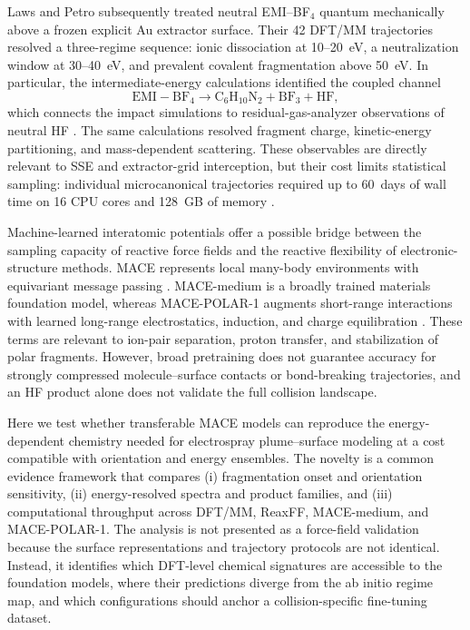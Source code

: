 \documentclass[preprint,review,12pt]{elsarticle}
\begin{document}
Laws and Petro \cite{Laws2026} subsequently treated neutral EMI--BF$_4$
quantum mechanically above a frozen explicit Au extractor surface. Their 42
DFT/MM trajectories resolved a three-regime sequence: ionic dissociation at
10--20~eV, a neutralization window at 30--40~eV, and prevalent covalent
fragmentation above 50~eV. In particular, the intermediate-energy calculations
identified the coupled channel
\begin{equation}
  \mathrm{EMI\!-\!BF_4 \rightarrow C_6H_{10}N_2 + BF_3 + HF},
  \label{eq:hf_channel}
\end{equation}
which connects the impact simulations to residual-gas-analyzer observations
of neutral HF \cite{Shaik2024}. The same calculations resolved fragment charge,
kinetic-energy partitioning, and mass-dependent scattering. These observables
are directly relevant to SSE and extractor-grid interception, but their cost
limits statistical sampling: individual microcanonical trajectories required
up to 60~days of wall time on 16 CPU cores and 128~GB of memory
\cite{Laws2026}.

Machine-learned interatomic potentials offer a possible bridge between the
sampling capacity of reactive force fields and the reactive flexibility of
electronic-structure methods. MACE represents local many-body environments
with equivariant message passing \cite{Batatia2022}. MACE-medium is a broadly
trained materials foundation model, whereas MACE-POLAR-1 augments short-range
interactions with learned long-range electrostatics, induction, and charge
equilibration \cite{Batatia2026Polar}. These terms are relevant to ion-pair
separation, proton transfer, and stabilization of polar fragments. However,
broad pretraining does not guarantee accuracy for strongly compressed
molecule--surface contacts or bond-breaking trajectories, and an HF product
alone does not validate the full collision landscape.

Here we test whether transferable MACE models can reproduce the
energy-dependent chemistry needed for electrospray plume--surface modeling at
a cost compatible with orientation and energy ensembles. The novelty is a
common evidence framework that compares (i) fragmentation onset and
orientation sensitivity, (ii) energy-resolved spectra and product families,
and (iii) computational throughput
across DFT/MM, ReaxFF, MACE-medium, and MACE-POLAR-1. The analysis is not
presented as a force-field validation because the surface representations and
trajectory protocols are not identical. Instead, it identifies which
DFT-level chemical signatures are accessible to the foundation models, where
their predictions diverge from the ab initio regime map, and which
configurations should anchor a collision-specific fine-tuning dataset.
\end{document}
